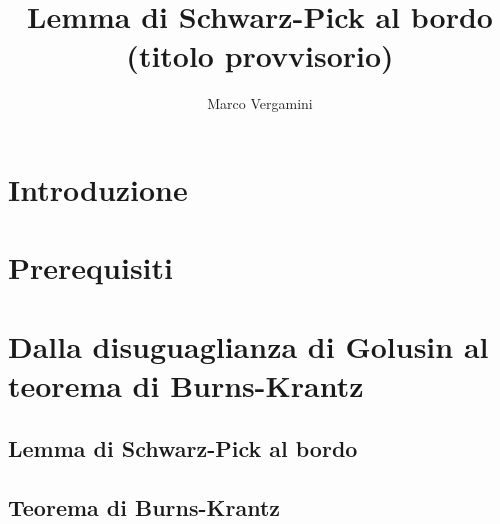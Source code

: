 \documentclass{article}
\title{Lemma di Schwarz-Pick al bordo (titolo provvisorio)}
\date{}
\author{Marco Vergamini}
\begin{document}
\maketitle
\newpage
\tableofcontents
\newpage


\section*{Introduzione}


\newpage

\section{Prerequisiti}

\newpage

\section{Dalla disuguaglianza di Golusin al teorema di Burns-Krantz}

\subsection{Lemma di Schwarz-Pick al bordo}


\subsection{Teorema di Burns-Krantz}


\newpage


\end{document}
